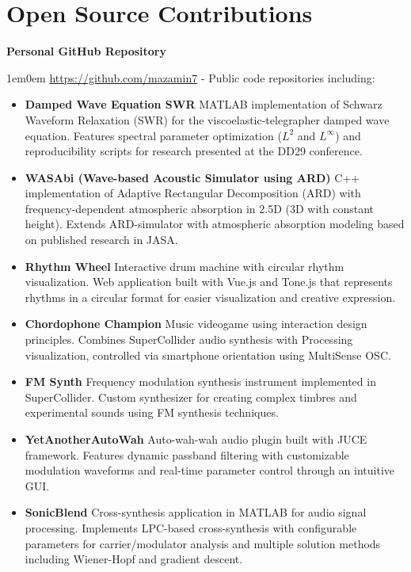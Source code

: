 \documentclass[11pt,a4paper]{article}
\newcommand{\cvdetail}[1]{%
  \begin{adjustwidth}{1em}{0em}
    #1
  \end{adjustwidth}%
  \vspace{0.5em}%
}
\newcommand{\cvsubitem}[2]{%
  \vspace{0.3em}%
  \noindent\textbf{#1} \hfill #2%
  \vspace{0.2em}%
}
\begin{document}
\section{Open Source Contributions}

\cvsubitem{Personal GitHub Repository}{}
\cvdetail{\url{https://github.com/mazamin7} - Public code repositories including:}

\begin{itemize}
  \item \textbf{Damped Wave Equation SWR}
        \newline MATLAB implementation of Schwarz Waveform Relaxation (SWR) for the viscoelastic-telegrapher damped wave equation. Features spectral parameter optimization ($L^2$ and $L^\infty$) and reproducibility scripts for research presented at the DD29 conference.

  \item \textbf{WASAbi (Wave-based Acoustic Simulator using ARD)} 
        \newline C++ implementation of Adaptive Rectangular Decomposition (ARD) with frequency-dependent atmospheric absorption in 2.5D (3D with constant height). Extends ARD-simulator with atmospheric absorption modeling based on published research in JASA.
  
  \item \textbf{Rhythm Wheel}
        \newline Interactive drum machine with circular rhythm visualization. Web application built with Vue.js and Tone.js that represents rhythms in a circular format for easier visualization and creative expression.
  
  \item \textbf{Chordophone Champion}
        \newline Music videogame using interaction design principles. Combines SuperCollider audio synthesis with Processing visualization, controlled via smartphone orientation using MultiSense OSC.
  
  \item \textbf{FM Synth}
        \newline Frequency modulation synthesis instrument implemented in SuperCollider. Custom synthesizer for creating complex timbres and experimental sounds using FM synthesis techniques.
  
  \item \textbf{YetAnotherAutoWah}
        \newline Auto-wah-wah audio plugin built with JUCE framework. Features dynamic passband filtering with customizable modulation waveforms and real-time parameter control through an intuitive GUI.
  
  \item \textbf{SonicBlend}
        \newline Cross-synthesis application in MATLAB for audio signal processing. Implements LPC-based cross-synthesis with configurable parameters for carrier/modulator analysis and multiple solution methods including Wiener-Hopf and gradient descent.
\end{itemize}
\end{document}
